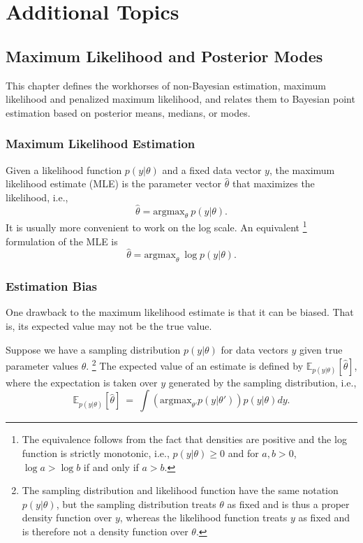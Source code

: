 \part{Additional Topics}

\chapter{Maximum Likelihood and Posterior Modes}\label{mle.chapter}

This chapter defines the workhorses of non-Bayesian estimation,
maximum likelihood and penalized maximum likelihood, and relates them
to Bayesian point estimation based on posterior means, medians, or
modes.

\section{Maximum Likelihood Estimation}

Given a likelihood function $p(y|\theta)$ and a fixed data vector $y$,
the maximum likelihood estimate (MLE) is the parameter vector $\hat{\theta}$
that maximizes the likelihood, i.e., 
\[
\hat{\theta} = \mbox{argmax}_{\theta} \ p(y|\theta).
\]
It is usually more convenient to work on the log scale.  
An equivalent%
%
\footnote{The equivalence follows from the fact that densities are
  positive and the log function is strictly monotonic, i.e., 
  $p(y|\theta) \geq 0$ and for $a, b > 0$, $\log a > \log b$ if and
  only if $a > b$.}
%
formulation of the MLE is
%
\[
\hat{\theta} = \mbox{argmax}_{\theta} \ \log p(y|\theta).
\]

\section{Estimation Bias}

One drawback to the maximum likelihood estimate is that it can be
biased. That is, its expected value may not be the true value.

Suppose we have a sampling distribution $p(y|\theta)$ for data vectors
$y$ given true parameter values $\theta$.%
%
\footnote{The sampling distribution and likelihood function have the
  same notation $p(y|\theta)$, but the sampling distribution treats
  $\theta$ as fixed and is thus a proper density function over $y$,
  whereas the likelihood function treats $y$ as fixed and is therefore
  not a density function over $\theta$.}
%
The expected value of an estimate is defined by 
$\mathbb{E}_{p(y|\theta)}[\hat{\theta}]$, where the expectation is
taken over $y$ generated by the sampling distribution, i.e.,
%
\[
\mathbb{E}_{p(y|\theta)}[\hat{\theta}] 
\ = \
\int \left( \mbox{argmax}_{\theta'} p(y|\theta') \right) p(y|\theta) dy.
\]


